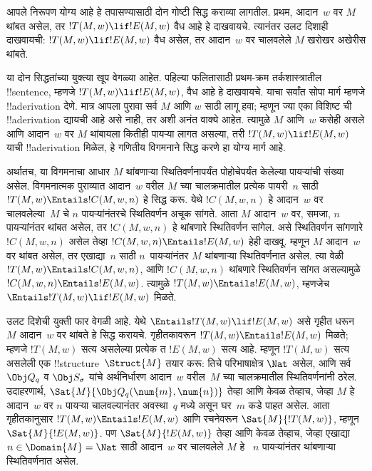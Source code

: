 \documentclass[../../../include/open-logic-section]{subfiles}
\begin{document}
\providecommand*{\OLMarathiVerificationEntailment}[2]{\ensuremath{#1}#2}

\begin{explain}
आपले निरूपण योग्य आहे हे तपासण्यासाठी दोन
गोष्टी सिद्ध कराव्या लागतील. प्रथम,
आदान~$w$ वर $M$ थांबत असेल, तर
$!T(M, w) \lif !E(M, w)$ वैध आहे
हे दाखवायचे. त्यानंतर उलट दिशाही
दाखवायची: $!T(M, w) \lif !E(M, w)$
वैध असेल, तर आदान~$w$ वर
चालवलेले $M$ खरोखर अखेरीस
थांबते.

या दोन सिद्धतांच्या युक्त्या खूप
वेगळ्या आहेत. पहिल्या फलितासाठी
प्रथम-क्रम तर्कशास्त्रातील
!!{sentence}, म्हणजे
$!T(M, w) \lif !E(M, w)$,
वैध आहे हे दाखवायचे. याचा
सर्वांत सोपा मार्ग म्हणजे
!!a{derivation} देणे.
मात्र आपला पुरावा सर्व $M$
आणि $w$ साठी लागू हवा;
म्हणून ज्या एका विशिष्ट
ची
!!a{derivation}
द्यायची आहे असे नाही,
तर अशी अनंत वाक्ये आहेत.
त्यामुळे $M$ आणि~$w$
कसेही असले आणि आदान~$w$
वर $M$ थांबायला कितीही
पायऱ्या लागत असल्या,
तरी $!T(M, w) \lif !E(M, w)$
याची !!a{derivation}
मिळेल, हे गणितीय विगमनाने
सिद्ध करणे हा योग्य मार्ग आहे.

अर्थातच, या विगमनाचा आधार
$M$ थांबणाऱ्या स्थितिवर्णनापर्यंत
पोहोचेपर्यंत केलेल्या पायऱ्यांची
संख्या असेल. विगमनात्मक पुराव्यात
आदान~$w$ वरील $M$ च्या
चालक्रमातील प्रत्येक पायरी~$n$
साठी $!T(M, w) \Entails !C(M, w, n)$
हे सिद्ध करू. येथे $!C(M, w, n)$
हे आदान~$w$ वर चालवलेल्या~$M$
चे $n$ पायऱ्यांनंतरचे स्थितिवर्णन
अचूक सांगते. आता $M$ आदान~$w$
वर, समजा, $n$ पायऱ्यांनंतर
थांबत असेल, तर $!C(M, w, n)$
हे थांबणारे स्थितिवर्णन सांगेल.
असे स्थितिवर्णन सांगणारे
$!C(M, w, n)$ असेल तेव्हा
$!C(M, w, n) \Entails !E(M, w)$
हेही दाखवू. म्हणून $M$
आदान~$w$ वर थांबत असेल,
तर एखाद्या~$n$ साठी
$n$~पायऱ्यांनंतर $M$
थांबणाऱ्या स्थितिवर्णनात असेल.
त्या वेळी $!T(M, w)
\Entails !C(M, w, n)$,
आणि $!C(M, w, n)$
थांबणारे स्थितिवर्णन सांगत
असल्यामुळे $!C(M, w, n) \Entails !E(M, w)$.
त्यामुळे $!T(M, w) \Entails !E(M, w)$,
म्हणजेच $\Entails !T(M, w)
\lif !E(M, w)$ मिळते.

उलट दिशेची युक्ती फार वेगळी
आहे. येथे $\Entails !T(M, w) \lif !E(M, w)$
असे गृहीत धरून $M$ आदान~$w$
वर थांबते हे सिद्ध करायचे.
गृहीतकावरून $!T(M, w) \Entails !E(M,
w)$ मिळते; म्हणजे $!T(M,
w)$ सत्य असलेल्या प्रत्येक
त
$!E(M, w)$ सत्य आहे.
म्हणून $!T(M, w)$ सत्य
असलेली एक !!{structure}~$\Struct{M}$ तयार करू:
तिचे परिभाषाक्षेत्र $\Nat$
असेल, आणि सर्व $\Obj Q_q$
व $\Obj S_\sigma$ यांचे
अर्थनिर्धारण आदान~$w$
वरील~$M$ च्या चालक्रमातील
स्थितिवर्णनांनी ठरेल.
उदाहरणार्थ,
$\Sat{M}{\Obj Q_q(\num{m}, \num{n})}$
तेव्हा आणि केवळ तेव्हाच, जेव्हा $M$ हे
आदान~$w$ वर $n$ पायऱ्या
चालवल्यानंतर अवस्था~$q$
मध्ये असून घर~$m$ कडे
पाहत असेल. आता गृहीतकानुसार
$!T(M, w) \Entails !E(M, w)$
आणि रचनेवरून
$\Sat{M}{!T(M,
  w)}$, म्हणून
$\Sat{M}{!E(M, w)}$.
पण $\Sat{M}{!E(M, w)}$
तेव्हा आणि केवळ तेव्हाच, जेव्हा एखाद्या
$n \in \Domain{M} = \Nat$
साठी आदान~$w$ वर
चालवलेले $M$ हे
~$n$ पायऱ्यांनंतर
थांबणाऱ्या स्थितिवर्णनात
असेल.
%
\end{explain}
\end{document}
